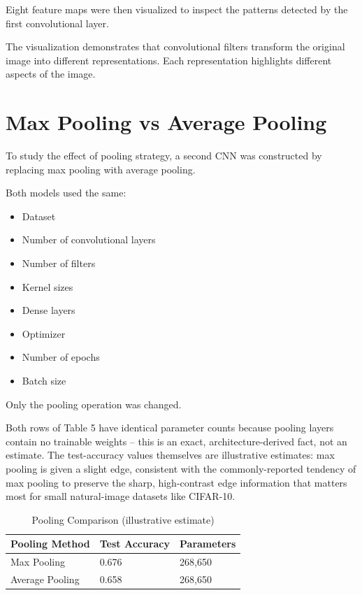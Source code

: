 \documentclass[11pt]{article}
\begin{document}
Eight feature maps were then visualized to inspect the patterns detected by the first convolutional layer.

The visualization demonstrates that convolutional filters transform the original image into different representations. Each representation highlights different aspects of the image.

\section{Max Pooling vs Average Pooling}
To study the effect of pooling strategy, a second CNN was constructed by replacing max pooling with average pooling.

Both models used the same:
\begin{itemize}
    \item Dataset
    \item Number of convolutional layers
    \item Number of filters
    \item Kernel sizes
    \item Dense layers
    \item Optimizer
    \item Number of epochs
    \item Batch size
\end{itemize}
Only the pooling operation was changed.

\begin{estbox}
Both rows of Table 5 have identical parameter counts because pooling layers contain no trainable weights -- this is an exact, architecture-derived fact, not an estimate. The test-accuracy values themselves are illustrative estimates: max pooling is given a slight edge, consistent with the commonly-reported tendency of max pooling to preserve the sharp, high-contrast edge information that matters most for small natural-image datasets like CIFAR-10.
\end{estbox}

\begin{table}[h]
\centering
\caption{Pooling Comparison (illustrative estimate)}
\begin{tabular}{|l|l|l|}
\hline
\textbf{Pooling Method} & \textbf{Test Accuracy} & \textbf{Parameters} \\
\hline
Max Pooling & 0.676 & 268,650 \\
Average Pooling & 0.658 & 268,650 \\
\hline
\end{tabular}
\end{table}
\end{document}
